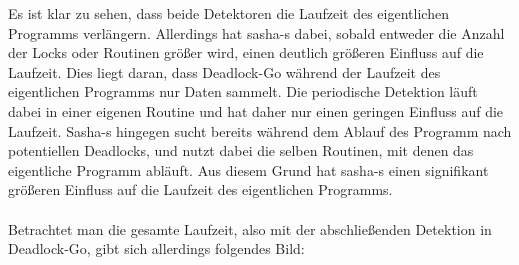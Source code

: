 Es ist klar zu sehen, dass beide Detektoren die Laufzeit des eigentlichen 
Programms verlängern. Allerdings hat sasha-s dabei, sobald entweder die Anzahl der 
Locks oder Routinen größer wird, einen deutlich größeren 
Einfluss auf die Laufzeit. Dies liegt daran, dass Deadlock-Go während der 
Laufzeit des eigentlichen Programms nur Daten sammelt. Die 
periodische Detektion läuft dabei in einer eigenen Routine und hat daher 
nur einen geringen Einfluss auf die Laufzeit. Sasha-s hingegen sucht bereits 
während dem Ablauf des Programm nach potentiellen Deadlocks, und nutzt dabei 
die selben Routinen, mit denen das eigentliche Programm abläuft. Aus diesem Grund
hat sasha-s einen signifikant größeren Einfluss auf die Laufzeit des eigentlichen
Programms. \\\\
Betrachtet man die gesamte Laufzeit, also mit der abschließenden Detektion in 
Deadlock-Go, gibt sich allerdings folgendes Bild:

